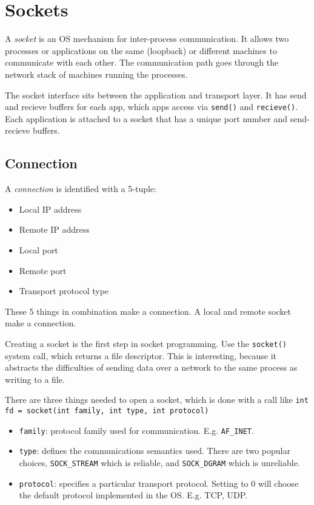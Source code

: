 \section{Sockets}

A \emph{socket} is an OS mechanism for inter-process communication.
It allows two processes or applications on the same (loopback) or
different machines to communicate with each other. The communication path
goes through the network stack of machines running the processes.

The socket interface sits between the application and transport layer.
It has send and recieve buffers for each app, which apps access via
\texttt{send()} and \texttt{recieve()}. Each application is attached to
a socket that has a unique port number and send-recieve buffers.

\subsection{Connection}

A \emph{connection} is identified with a 5-tuple:
\begin{itemize}
    \item Local IP address
    \item Remote IP address
    \item Local port
    \item Remote port
    \item Transport protocol type
\end{itemize}
These 5 things in combination make a connection. A local and
remote socket make a connection.

Creating a socket is the first step in socket programming.
Use the \texttt{socket()} system call, which returns a file
descriptor. This is interesting, because it abstracts the difficulties
of sending data over a network to the same process as writing
to a file.

There are three things needed to open a socket, which is done with a
call like \texttt{int fd = socket(int family, int type, int protocol)}
\begin{itemize}
    \item \texttt{family}: protocol family used for communication. E.g. \texttt{AF\_INET}.
    \item \texttt{type}: defines the communications semantics used. There are two
          popular choices, \texttt{SOCK\_STREAM} which is reliable, and \texttt{SOCK\_DGRAM}
          which is unreliable.
    \item \texttt{protocol}: specifies a particular transport protocol. Setting to 0
          will choose the default protocol implemented in the OS. E.g. TCP, UDP.
\end{itemize}

